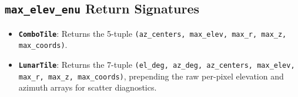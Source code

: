 \documentclass[11pt,letterpaper]{article}
\begin{document}
\subsection{\texttt{max\_elev\_enu} Return Signatures}
\begin{itemize}
  \item \textbf{\texttt{ComboTile}}: Returns the 5-tuple \texttt{(az\_centers, max\_elev, max\_r, max\_z, max\_coords)}.
  \item \textbf{\texttt{LunarTile}}: Returns the 7-tuple \texttt{(el\_deg, az\_deg, az\_centers, max\_elev, max\_r, max\_z, max\_coords)}, prepending the raw per-pixel elevation and azimuth arrays for scatter diagnostics.
\end{itemize}
\end{document}
